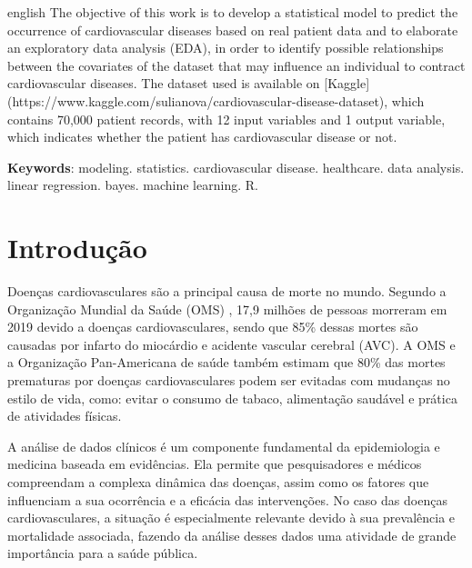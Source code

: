\documentclass[article,11pt,a4paper,brazil]{abntex2}
\begin{document}
	\renewcommand{\resumoname}{Abstract}
	\begin{resumoumacoluna}
		\begin{otherlanguage*}{english}
			The objective of this work is to develop a statistical model to predict the occurrence of cardiovascular diseases based on real patient data and to elaborate an exploratory data analysis (EDA), in order to identify possible relationships between the covariates of the dataset that may influence an individual to contract cardiovascular diseases. The dataset used is available on [Kaggle](https://www.kaggle.com/sulianova/cardiovascular-disease-dataset), which contains 70,000 patient records, with 12 input variables and 1 output variable, which indicates whether the patient has cardiovascular disease or not.
			
			\vspace{\onelineskip}
			
			\noindent
			\textbf{Keywords}: modeling. statistics. cardiovascular disease. healthcare. data analysis. linear regression. bayes. machine learning. R.
		\end{otherlanguage*}  
	\end{resumoumacoluna}

	\newpage

	\thispagestyle{empty}
	\tableofcontents*
	\newpage

	\section{Introdução}
	\setcounter{page}{1}
	\pagestyle{plain}
	Doenças cardiovasculares são a principal causa de morte no mundo. Segundo a Organização Mundial da Saúde (OMS) \cite{who-cardiovascular-diseases}, 17,9 milhões de pessoas morreram em 2019 devido a doenças cardiovasculares, sendo que 85\% dessas mortes são causadas por infarto do miocárdio e acidente vascular cerebral (AVC). A OMS e a Organização Pan-Americana de saúde \cite{opas-doenças-cardiovasculares} também estimam que 80\% das mortes prematuras por doenças cardiovasculares podem ser evitadas com mudanças no estilo de vida, como: evitar o consumo de tabaco, alimentação saudável e prática de atividades físicas. 
	
	A análise de dados clínicos é um componente fundamental da epidemiologia e medicina baseada em evidências. Ela permite que pesquisadores e médicos compreendam a complexa dinâmica das doenças, assim como os fatores que influenciam a sua ocorrência e a eficácia das intervenções. No caso das doenças cardiovasculares, a situação é especialmente relevante devido à sua prevalência e mortalidade associada, fazendo da análise desses dados uma atividade de grande importância para a saúde pública.
	
\end{document}
